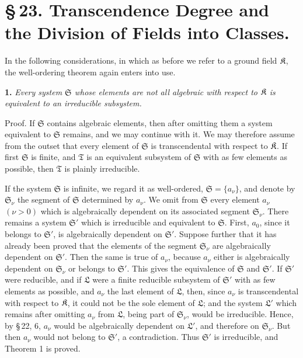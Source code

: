 \section*{\S\,23. Transcendence Degree and the Division of Fields into Classes.}

In the following considerations, in which as before we refer to a ground field \(\mathfrak K\), the well-ordering theorem again enters into use.

\textbf{1.} \emph{Every system \(\mathfrak S\) whose elements are not all algebraic with respect to \(\mathfrak K\) is equivalent to an irreducible subsystem.}

Proof. If \(\mathfrak S\) contains algebraic elements, then after omitting them a system equivalent to \(\mathfrak S\) remains, and we may continue with it. We may therefore assume from the outset that every element of \(\mathfrak S\) is transcendental with respect to \(\mathfrak K\). If first \(\mathfrak S\) is finite, and \(\mathfrak T\) is an equivalent subsystem of \(\mathfrak S\) with as few elements as possible, then \(\mathfrak T\) is plainly irreducible.

If the system \(\mathfrak S\) is infinite, we regard it as well-ordered, \(\mathfrak S=\{a_\nu\}\), and denote by \(\mathfrak S_\nu\) the segment of \(\mathfrak S\) determined by \(a_\nu\). We omit from \(\mathfrak S\) every element \(a_\nu\) \((\nu>0)\) which is algebraically dependent on its associated segment \(\mathfrak S_\nu\). There remains a system \(\mathfrak S'\) which is irreducible and equivalent to \(\mathfrak S\). First, \(a_0\), since it belongs to \(\mathfrak S'\), is algebraically dependent on \(\mathfrak S'\). Suppose further that it has already been proved that the elements of the segment \(\mathfrak S_\nu\) are algebraically dependent on \(\mathfrak S'\). Then the same is true of \(a_\nu\), because \(a_\nu\) either is algebraically dependent on \(\mathfrak S_\nu\) or belongs to \(\mathfrak S'\). This gives the equivalence of \(\mathfrak S\) and \(\mathfrak S'\). If \(\mathfrak S'\) were reducible, and if \(\mathfrak L\) were a finite reducible subsystem of \(\mathfrak S'\) with as few elements as possible, and \(a_\nu\) the last element of \(\mathfrak L\), then, since \(a_\nu\) is transcendental with respect to \(\mathfrak K\), it could not be the sole element of \(\mathfrak L\); and the system \(\mathfrak L'\) which remains after omitting \(a_\nu\) from \(\mathfrak L\), being part of \(\mathfrak S_\nu\), would be irreducible. Hence, by \S\,22, 6, \(a_\nu\) would be algebraically dependent on \(\mathfrak L'\), and therefore on \(\mathfrak S_\nu\). But then \(a_\nu\) would not belong to \(\mathfrak S'\), a contradiction. Thus \(\mathfrak S'\) is irreducible, and Theorem 1 is proved.

